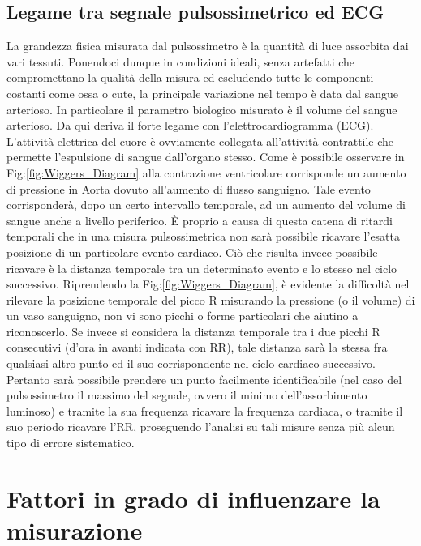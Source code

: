 \documentclass[12pt,a4paper, twoside, openright]{report}
\begin{document}
\subsection{Legame tra segnale pulsossimetrico ed ECG}

La grandezza fisica misurata dal pulsossimetro è la quantità di luce assorbita dai vari tessuti.
Ponendoci dunque in condizioni ideali, senza artefatti che compromettano la qualità della misura ed escludendo tutte le componenti costanti come ossa o cute, la principale variazione nel tempo è data dal sangue arterioso.
In particolare il parametro biologico misurato è il volume del sangue arterioso.
Da qui deriva il forte legame con l'elettrocardiogramma (ECG).
L'attività elettrica del cuore è ovviamente collegata all'attività contrattile che permette l'espulsione di sangue dall'organo stesso.
Come è possibile osservare in Fig:\ref{fig:Wiggers_Diagram} alla contrazione ventricolare corrisponde un aumento di pressione in Aorta dovuto all'aumento di flusso sanguigno.
Tale evento corrisponderà, dopo un certo intervallo temporale, ad un aumento del volume di sangue anche a livello periferico.
È proprio a causa di questa catena di ritardi temporali che in una misura pulsossimetrica non sarà possibile ricavare l'esatta posizione di un particolare evento cardiaco.
Ciò che risulta invece possibile ricavare è la distanza temporale tra un determinato evento e lo stesso nel ciclo successivo.
Riprendendo la Fig:\ref{fig:Wiggers_Diagram}, è evidente la difficoltà nel rilevare la posizione temporale del picco R misurando la pressione (o il volume) di un vaso sanguigno, non vi sono picchi o forme particolari che aiutino a riconoscerlo.
Se invece si considera la distanza temporale tra i due picchi R consecutivi (d'ora in avanti indicata con RR), tale distanza sarà la stessa fra qualsiasi altro punto ed il suo corrispondente nel ciclo cardiaco successivo.
Pertanto sarà possibile prendere un punto facilmente identificabile (nel caso del pulsossimetro il massimo del segnale, ovvero il minimo dell'assorbimento luminoso) e tramite la sua frequenza ricavare la frequenza cardiaca, o tramite il suo periodo ricavare l'RR, proseguendo l'analisi su tali misure senza più alcun tipo di errore sistematico.



\section{Fattori in grado di influenzare la misurazione}
\end{document}
